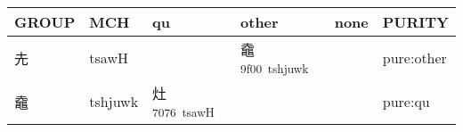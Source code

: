 \documentclass[14pt,a4paper]{scrartcl}
\begin{document}
\begin{longtable}[c]{@{}llllll@{}}
\toprule
\begin{minipage}[b]{0.14\columnwidth}\raggedright\strut
GROUP
\strut\end{minipage} &
\begin{minipage}[b]{0.14\columnwidth}\raggedright\strut
MCH
\strut\end{minipage} &
\begin{minipage}[b]{0.14\columnwidth}\raggedright\strut
qu
\strut\end{minipage} &
\begin{minipage}[b]{0.14\columnwidth}\raggedright\strut
other
\strut\end{minipage} &
\begin{minipage}[b]{0.14\columnwidth}\raggedright\strut
none
\strut\end{minipage} &
\begin{minipage}[b]{0.14\columnwidth}\raggedright\strut
PURITY
\strut\end{minipage}\tabularnewline
\midrule
\endhead
\begin{minipage}[t]{0.14\columnwidth}\raggedright\strut
圥
\strut\end{minipage} &
\begin{minipage}[t]{0.14\columnwidth}\raggedright\strut
tsawH
\strut\end{minipage} &
\begin{minipage}[t]{0.14\columnwidth}\raggedright\strut
\strut\end{minipage} &
\begin{minipage}[t]{0.14\columnwidth}\raggedright\strut
鼀\textsuperscript{9f00~tshjuwk}
\strut\end{minipage} &
\begin{minipage}[t]{0.14\columnwidth}\raggedright\strut
\strut\end{minipage} &
\begin{minipage}[t]{0.14\columnwidth}\raggedright\strut
pure:other
\strut\end{minipage}\tabularnewline
\begin{minipage}[t]{0.14\columnwidth}\raggedright\strut
鼀
\strut\end{minipage} &
\begin{minipage}[t]{0.14\columnwidth}\raggedright\strut
tshjuwk
\strut\end{minipage} &
\begin{minipage}[t]{0.14\columnwidth}\raggedright\strut
灶\textsuperscript{7076~tsawH}
\strut\end{minipage} &
\begin{minipage}[t]{0.14\columnwidth}\raggedright\strut
\strut\end{minipage} &
\begin{minipage}[t]{0.14\columnwidth}\raggedright\strut
\strut\end{minipage} &
\begin{minipage}[t]{0.14\columnwidth}\raggedright\strut
pure:qu
\strut\end{minipage}\tabularnewline
\bottomrule
\end{longtable}
\end{document}
